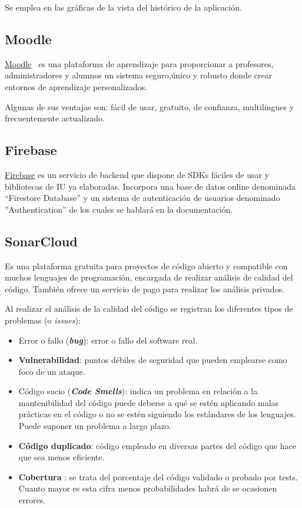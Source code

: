 Se emplea en las gráficas de la vista del histórico de la aplicación.

\subsection{Moodle}
\href{https://moodle.org/}{Moodle}~\cite{pagina_Moodle} es una plataforma de aprendizaje para proporcionar a profesores, administradores y alumnos un sistema seguro,único y robusto donde crear entornos de aprendizaje personalizados.

Algunas de sus ventajas son: fácil de usar, gratuito, de confianza, multilingues y frecuentemente actualizado.

\subsection{Firebase}
\href{https://firebase.google.com/}{Firebase} es un servicio de backend que dispone de SDKs fáciles de usar y bibliotecas de IU ya elaboradas. 
Incorpora una base de datos online denominada ``Firestore Database'' y un sistema de autenticación de usuarios denominado ''Authentication'' de los cuales se hablará en la documentación.

\subsection{SonarCloud}
Es una plataforma gratuita para proyectos de código abierto y compatible con muchos lenguajes de programación, encargada de realizar análisis de calidad del código. También ofrece un servicio de pago para realizar los análisis privados.

Al realizar el análisis de la calidad del código se registran los diferentes tipos de problemas (o \emph{issues}):
\begin{itemize}
	\tightlist
	\item Error o fallo (\textbf{\emph{bug}}): error o fallo del software real.   
	\item \textbf{Vulnerabilidad}: puntos débiles de seguridad que pueden emplearse como foco de un ataque.
	\item Código sucio (\textbf{\emph{Code Smells}}): indica un problema en relación a la mantenibilidad del código puede deberse a qué se estén aplicando malas prácticas en el código o no se estén siguiendo los estándares de los lenguajes. Puede suponer un problema a largo plazo.
	\item \textbf{Código duplicado}: código empleado en diversas partes del código que hace que sea menos eficiente.
	\item \textbf{Cobertura }: se trata del porcentaje del código validado o probado por tests. Cuanto mayor es esta cifra menos probabilidades habrá de se ocasionen errores.	
\end{itemize}

